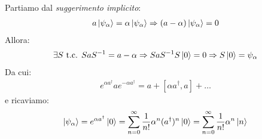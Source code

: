 \documentclass[../../FisicaTeorica.tex]{subfiles}
\begin{document}
\begin{enumerate}
Partiamo dal \textit{suggerimento implicito}:
\begin{align*}
a \Ket{\psi_\alpha} = \alpha \Ket{\psi_\alpha} \Rightarrow  (a-\alpha)\Ket{\psi_\alpha} = 0
\end{align*}
Allora:
\begin{align*}
\exists S \text{ t.c. } SaS^{-1} = a -\alpha \Rightarrow  Sa S^{-1} S\Ket{0} = 0 \Rightarrow  S\Ket{0} = \psi_\alpha
\end{align*}
Da cui:
\begin{align*}
e^{\alpha a^\dag} a e^{-\alpha a^\dag} = a + [\alpha a^\dag, a] + \dots
\end{align*}
e ricaviamo:
\begin{align*}
\Ket{\psi_\alpha}=e^{\alpha a^\dag} \Ket{0} = \sum_{n=0}^{\infty}\frac{1}{n!} \alpha^n (a^\dag)^n \Ket{0} = \sum_{n=0}^{\infty}\frac{1}{n!}\alpha^n \Ket{n}
\end{align*}

\end{enumerate}
\end{document}

